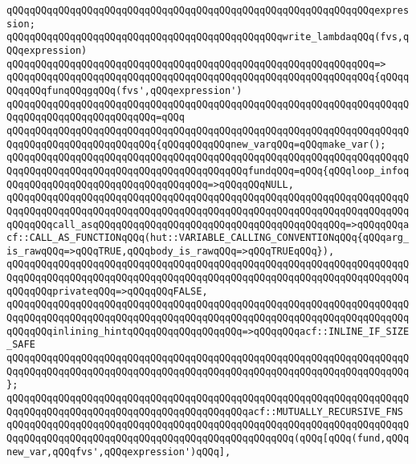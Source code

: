 \verb|qQQqqQQqqQQqqQQqqQQqqQQqqQQqqQQqqQQqqQQqqQQqqQQqqQQqqQQqqQQqqQQqexpression;|\newline
\newline
\verb|qQQqqQQqqQQqqQQqqQQqqQQqqQQqqQQqqQQqqQQqqQQqqQQqwrite_lambdaqQQq(fvs,qQQqexpression)|\newline
\verb|qQQqqQQqqQQqqQQqqQQqqQQqqQQqqQQqqQQqqQQqqQQqqQQqqQQqqQQqqQQqqQQq=>|\newline
\verb|qQQqqQQqqQQqqQQqqQQqqQQqqQQqqQQqqQQqqQQqqQQqqQQqqQQqqQQqqQQqqQQq{qQQqqQQqqQQqfunqQQqgqQQq(fvs',qQQqexpression')|\newline
\verb|qQQqqQQqqQQqqQQqqQQqqQQqqQQqqQQqqQQqqQQqqQQqqQQqqQQqqQQqqQQqqQQqqQQqqQQqqQQqqQQqqQQqqQQqqQQqqQQq=qQQq|\newline
\verb|qQQqqQQqqQQqqQQqqQQqqQQqqQQqqQQqqQQqqQQqqQQqqQQqqQQqqQQqqQQqqQQqqQQqqQQqqQQqqQQqqQQqqQQqqQQqqQQq{qQQqqQQqqQQqnew_varqQQq=qQQqmake_var();|\newline
\newline
\verb|qQQqqQQqqQQqqQQqqQQqqQQqqQQqqQQqqQQqqQQqqQQqqQQqqQQqqQQqqQQqqQQqqQQqqQQqqQQqqQQqqQQqqQQqqQQqqQQqqQQqqQQqqQQqqQQqfundqQQq=qQQq{qQQqloop_infoqQQqqQQqqQQqqQQqqQQqqQQqqQQqqQQqqQQq=>qQQqqQQqNULL,|\newline
\verb|qQQqqQQqqQQqqQQqqQQqqQQqqQQqqQQqqQQqqQQqqQQqqQQqqQQqqQQqqQQqqQQqqQQqqQQqqQQqqQQqqQQqqQQqqQQqqQQqqQQqqQQqqQQqqQQqqQQqqQQqqQQqqQQqqQQqqQQqqQQqqQQqqQQqcall_asqQQqqQQqqQQqqQQqqQQqqQQqqQQqqQQqqQQqqQQqqQQq=>qQQqqQQqacf::CALL_AS_FUNCTIONqQQq(hut::VARIABLE_CALLING_CONVENTIONqQQq{qQQqarg_is_rawqQQq=>qQQqTRUE,qQQqbody_is_rawqQQq=>qQQqTRUEqQQq}),|\newline
\verb|qQQqqQQqqQQqqQQqqQQqqQQqqQQqqQQqqQQqqQQqqQQqqQQqqQQqqQQqqQQqqQQqqQQqqQQqqQQqqQQqqQQqqQQqqQQqqQQqqQQqqQQqqQQqqQQqqQQqqQQqqQQqqQQqqQQqqQQqqQQqqQQqqQQqprivateqQQq=>qQQqqQQqFALSE,|\newline
\verb|qQQqqQQqqQQqqQQqqQQqqQQqqQQqqQQqqQQqqQQqqQQqqQQqqQQqqQQqqQQqqQQqqQQqqQQqqQQqqQQqqQQqqQQqqQQqqQQqqQQqqQQqqQQqqQQqqQQqqQQqqQQqqQQqqQQqqQQqqQQqqQQqqQQqinlining_hintqQQqqQQqqQQqqQQqqQQq=>qQQqqQQqacf::INLINE_IF_SIZE_SAFE|\newline
\verb|qQQqqQQqqQQqqQQqqQQqqQQqqQQqqQQqqQQqqQQqqQQqqQQqqQQqqQQqqQQqqQQqqQQqqQQqqQQqqQQqqQQqqQQqqQQqqQQqqQQqqQQqqQQqqQQqqQQqqQQqqQQqqQQqqQQqqQQqqQQq};|\newline
\newline
\verb|qQQqqQQqqQQqqQQqqQQqqQQqqQQqqQQqqQQqqQQqqQQqqQQqqQQqqQQqqQQqqQQqqQQqqQQqqQQqqQQqqQQqqQQqqQQqqQQqqQQqqQQqqQQqqQQqacf::MUTUALLY_RECURSIVE_FNS|\newline
\verb|qQQqqQQqqQQqqQQqqQQqqQQqqQQqqQQqqQQqqQQqqQQqqQQqqQQqqQQqqQQqqQQqqQQqqQQqqQQqqQQqqQQqqQQqqQQqqQQqqQQqqQQqqQQqqQQqqQQqqQQq(qQQq[qQQq(fund,qQQqnew_var,qQQqfvs',qQQqexpression')qQQq],|\newline
